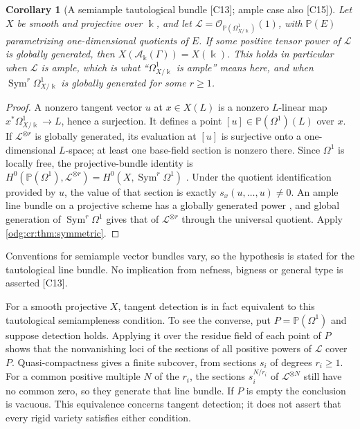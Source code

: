 \documentclass[11pt,oneside]{article}
\numberwithin{equation}{section}
\newtheorem{corollary}[corollary]{Corollary}
\theoremstyle{definition}
\theoremstyle{remark}
\newcommand{\src}[1]{\textup{\textsf{\small[#1]}}}
\newcommand{\crA}{\mathcal A_\Bbbk(\Gamma)}
\newcommand{\Sym}{\operatorname{Sym}}
\begin{document}
\begin{corollary}[A semiample tautological bundle \src{C13}; ample case also \src{C15}]\label{odg:cr:cor:semiample}
Let $X$ be smooth and projective over $\Bbbk$, and let
$\mathcal L=\mathcal O_{\mathbb P(\Omega^1_{X/\Bbbk})}(1)$, with $\mathbb P(E)$
parametrizing one-dimensional quotients of $E$. If some positive tensor power of
$\mathcal L$ is globally generated, then $X(\crA)=X(\Bbbk)$. This holds in
particular when $\mathcal L$ is ample, which is what ``$\Omega^1_{X/\Bbbk}$ is
ample'' means here, and when $\Sym^r\Omega^1_{X/\Bbbk}$ is globally generated for
some $r\ge1$.
\end{corollary}
\begin{proof}
A nonzero tangent vector $u$ at $x\in X(L)$ is a nonzero $L$-linear map
$x^*\Omega^1_{X/\Bbbk}\to L$, hence a surjection. It defines a point
$[u]\in\mathbb P(\Omega^1)(L)$ over $x$. If $\mathcal L^{\otimes r}$ is
globally generated, its evaluation at $[u]$ is surjective onto a
one-dimensional $L$-space; at least one base-field section is nonzero
there. Since $\Omega^1$ is locally free, the projective-bundle identity is
$H^0(\mathbb P(\Omega^1),\mathcal L^{\otimes r})=H^0(X,\Sym^r\Omega^1)$
\cite[Tag 01OA]{StacksProjBundle}. Under the quotient identification
provided by $u$, the value of that section is exactly
$s_x(u,\ldots,u)\ne0$. An ample line
bundle on a projective scheme has a globally generated power
\cite[Tag 01PR]{StacksAmple}, and global generation of $\Sym^r\Omega^1$ gives that of
$\mathcal L^{\otimes r}$ through the universal quotient. Apply
\cref{odg:cr:thm:symmetric}.
\end{proof}

Conventions for semiample vector bundles vary, so the hypothesis is stated for
the tautological line bundle. No implication from nefness, bigness or general
type is asserted \src{C13}.

For a smooth projective $X$, tangent detection is in fact equivalent to
this tautological semiampleness condition. To see the converse, put
$P=\mathbb P(\Omega^1)$ and suppose detection holds. Applying it over
the residue field of each point of $P$ shows that the nonvanishing loci
of the sections of all positive powers of $\mathcal L$ cover $P$.
Quasi-compactness gives a finite subcover, from sections $s_i$ of degrees
$r_i\ge1$. For a common positive multiple $N$ of the $r_i$, the sections
$s_i^{N/r_i}$ of $\mathcal L^{\otimes N}$ still have no common zero,
so they generate that line bundle. If $P$ is empty the conclusion is
vacuous. This equivalence concerns tangent detection; it does not assert
that every rigid variety satisfies either condition.
\end{document}

